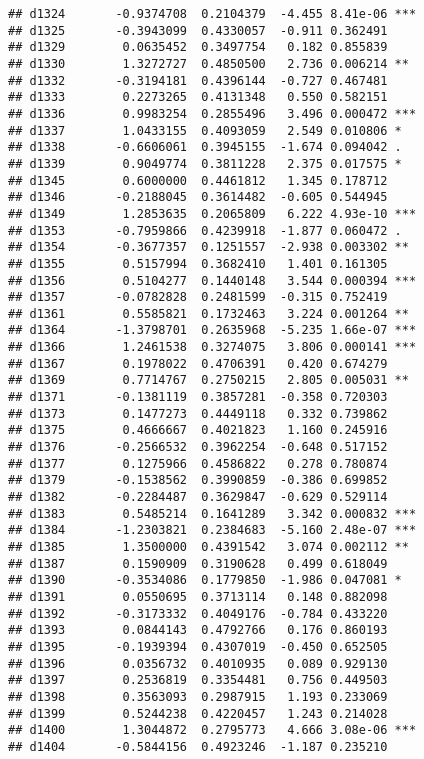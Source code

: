 \documentclass[
]{article}
\begin{document}
\begin{verbatim}
## d1324       -0.9374708  0.2104379  -4.455 8.41e-06 ***
## d1325       -0.3943099  0.4330057  -0.911 0.362491    
## d1329        0.0635452  0.3497754   0.182 0.855839    
## d1330        1.3272727  0.4850500   2.736 0.006214 ** 
## d1332       -0.3194181  0.4396144  -0.727 0.467481    
## d1333        0.2273265  0.4131348   0.550 0.582151    
## d1336        0.9983254  0.2855496   3.496 0.000472 ***
## d1337        1.0433155  0.4093059   2.549 0.010806 *  
## d1338       -0.6606061  0.3945155  -1.674 0.094042 .  
## d1339        0.9049774  0.3811228   2.375 0.017575 *  
## d1345        0.6000000  0.4461812   1.345 0.178712    
## d1346       -0.2188045  0.3614482  -0.605 0.544945    
## d1349        1.2853635  0.2065809   6.222 4.93e-10 ***
## d1353       -0.7959866  0.4239918  -1.877 0.060472 .  
## d1354       -0.3677357  0.1251557  -2.938 0.003302 ** 
## d1355        0.5157994  0.3682410   1.401 0.161305    
## d1356        0.5104277  0.1440148   3.544 0.000394 ***
## d1357       -0.0782828  0.2481599  -0.315 0.752419    
## d1361        0.5585821  0.1732463   3.224 0.001264 ** 
## d1364       -1.3798701  0.2635968  -5.235 1.66e-07 ***
## d1366        1.2461538  0.3274075   3.806 0.000141 ***
## d1367        0.1978022  0.4706391   0.420 0.674279    
## d1369        0.7714767  0.2750215   2.805 0.005031 ** 
## d1371       -0.1381119  0.3857281  -0.358 0.720303    
## d1373        0.1477273  0.4449118   0.332 0.739862    
## d1375        0.4666667  0.4021823   1.160 0.245916    
## d1376       -0.2566532  0.3962254  -0.648 0.517152    
## d1377        0.1275966  0.4586822   0.278 0.780874    
## d1379       -0.1538562  0.3990859  -0.386 0.699852    
## d1382       -0.2284487  0.3629847  -0.629 0.529114    
## d1383        0.5485214  0.1641289   3.342 0.000832 ***
## d1384       -1.2303821  0.2384683  -5.160 2.48e-07 ***
## d1385        1.3500000  0.4391542   3.074 0.002112 ** 
## d1387        0.1590909  0.3190628   0.499 0.618049    
## d1390       -0.3534086  0.1779850  -1.986 0.047081 *  
## d1391        0.0550695  0.3713114   0.148 0.882098    
## d1392       -0.3173332  0.4049176  -0.784 0.433220    
## d1393        0.0844143  0.4792766   0.176 0.860193    
## d1395       -0.1939394  0.4307019  -0.450 0.652505    
## d1396        0.0356732  0.4010935   0.089 0.929130    
## d1397        0.2536819  0.3354481   0.756 0.449503    
## d1398        0.3563093  0.2987915   1.193 0.233069    
## d1399        0.5244238  0.4220457   1.243 0.214028    
## d1400        1.3044872  0.2795773   4.666 3.08e-06 ***
## d1404       -0.5844156  0.4923246  -1.187 0.235210    

\end{verbatim}
\end{document}
